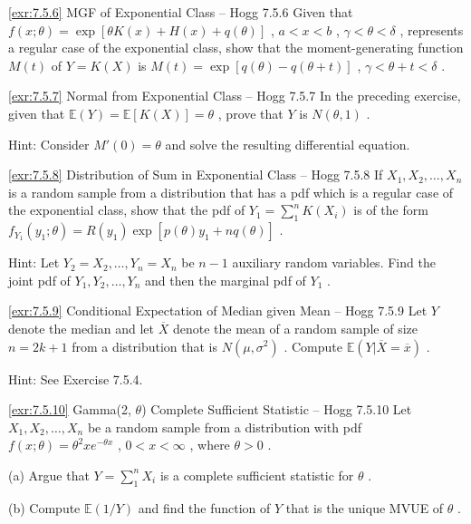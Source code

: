 \begin{exercise}{\ref{exr:7.5.6} MGF of Exponential Class – Hogg 7.5.6}\label{exr:7.5.6}
Given that $f(x; \theta) = \exp[\theta K(x) + H(x) + q(\theta)]$ , $a < x < b$ , $\gamma < \theta < \delta$ , represents a regular case of the exponential class, show that the moment-generating function $M(t)$ of $Y = K(X)$ is $M(t) = \exp[q(\theta) - q(\theta + t)]$ , $\gamma < \theta + t < \delta$ .
\end{exercise}

\begin{exercise}{\ref{exr:7.5.7} Normal from Exponential Class – Hogg 7.5.7}\label{exr:7.5.7}
In the preceding exercise, given that $\mathbb{E}(Y) = \mathbb{E}[K(X)] = \theta$ , prove that $Y$ is $N(\theta, 1)$ .

Hint: Consider $M'(0) = \theta$ and solve the resulting differential equation.
\end{exercise}

\begin{exercise}{\ref{exr:7.5.8} Distribution of Sum in Exponential Class – Hogg 7.5.8}\label{exr:7.5.8}
If $X_{1}, X_{2}, \ldots, X_{n}$ is a random sample from a distribution that has a pdf which is a regular case of the exponential class, show that the pdf of $Y_{1} = \sum_{1}^{n} K(X_{i})$ is of the form $f_{Y_1}(y_1; \theta) = R(y_1) \exp[p(\theta) y_1 + n q(\theta)]$ .

Hint: Let $Y_{2} = X_{2}, \ldots, Y_{n} = X_{n}$ be $n - 1$ auxiliary random variables. Find the joint pdf of $Y_{1}, Y_{2}, \ldots, Y_{n}$ and then the marginal pdf of $Y_{1}$ .
\end{exercise}

\begin{exercise}{\ref{exr:7.5.9} Conditional Expectation of Median given Mean – Hogg 7.5.9}\label{exr:7.5.9}
Let $Y$ denote the median and let $\overline{X}$ denote the mean of a random sample of size $n = 2k + 1$ from a distribution that is $N(\mu, \sigma^2)$ . Compute $\mathbb{E}(Y|\overline{X} = \overline{x})$ .

Hint: See Exercise 7.5.4.
\end{exercise}

\begin{exercise}{\ref{exr:7.5.10} Gamma(2, $\theta$) Complete Sufficient Statistic – Hogg 7.5.10}\label{exr:7.5.10}
Let $X_1, X_2, \ldots, X_n$ be a random sample from a distribution with pdf $f(x; \theta) = \theta^2 x e^{-\theta x}$ , $0 < x < \infty$ , where $\theta > 0$ .

(a) Argue that $Y = \sum_{1}^{n} X_{i}$ is a complete sufficient statistic for $\theta$ .

(b) Compute $\mathbb{E}(1 / Y)$ and find the function of $Y$ that is the unique MVUE of $\theta$ .
\end{exercise}

